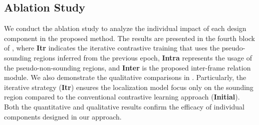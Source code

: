 % 




\vspace{-0.2mm}
\subsection{Ablation Study}
\vspace{\subsecmargin}
\label{sec:ablation}

We conduct the ablation study to analyze the individual impact of each design component in the proposed method.
%
The results are presented in the fourth block of , where \textbf{Itr} indicates the iterative contrastive training that uses the pseudo-sounding regions inferred from the previous epoch, \textbf{Intra} represents the usage of the pseudo-non-sounding regions, and \textbf{Inter} is the proposed inter-frame relation module.
%
We also demonstrate the qualitative comparisons in .
%
Particularly, the iterative strategy (\ie \textbf{Itr}) ensures the localization model focus only on the sounding region compared to the conventional contrastive learning approach (\ie \textbf{Initial}).
%
Both the quantitative and qualitative results confirm the efficacy of individual components designed in our approach.

